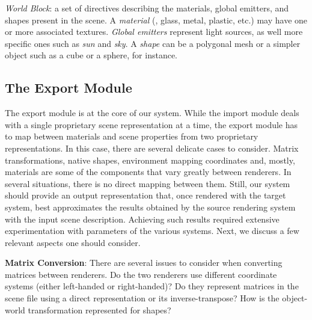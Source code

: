 \noindent \textit{World Block}:
a set of directives describing the materials, global emitters, and shapes present in the scene.
%
A {\it material} (\eg, glass, metal, plastic, etc.) may have one or more associated textures. {\it Global emitters} represent  light sources, as well more specific ones such as {\it sun} and {\it sky}.
%
A {\it shape} can be a polygonal mesh or a simpler object such as a cube or a sphere, for instance. 



\subsection{The Export Module}

The export module is at the core of our system. While the import module deals with a single proprietary scene representation at a time, the export module has to map between materials and scene properties from two proprietary representations. 
In this case, there are several delicate cases to
consider. Matrix transformations, native shapes, environment mapping coordinates and, mostly, materials are
some of the components that vary greatly between renderers. 
In several situations, there is no direct mapping between them. Still, our system should provide an output representation that, once rendered with the target system, best approximates the results obtained by the source rendering system with the input scene description. 
Achieving such results required extensive experimentation with parameters of the various systems. Next, we discuss a few relevant aspects one should consider.    
  
\textbf{Matrix Conversion}: 
There are several issues to consider when converting matrices between renderers.
Do the two renderers use different coordinate systems (either left-handed or right-handed)? 
Do they represent matrices in the scene file using a direct representation or its
inverse-transpose? How is the object-world transformation represented for
shapes?

